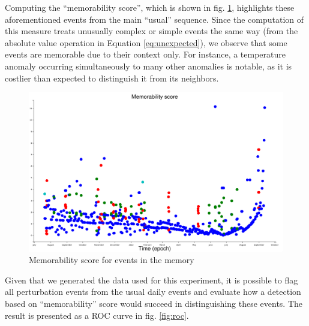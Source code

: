 \documentclass[conference]{IEEEtran}
\begin{document}
Computing the ``memorability score'', which is shown in fig. \ref{fig:result1},
highlights these aforementioned events from the main ``usual'' sequence. Since
the computation of this measure treats unusually complex or simple events the
same way (from the absolute value operation in Equation \ref{eq:unexpected}), we
observe that some events are memorable due to their context only. For instance,
a temperature anomaly occurring simultaneously to many other anomalies is
notable, as it is costlier than expected to distinguish it from its neighbors.

\begin{figure}[ht]
  \centering
  \includegraphics[width=\linewidth]{figures/complexities_surprises}
  \caption{Memorability score for events in the memory}
  \label{fig:result1}
\end{figure}

Given that we generated the data used for this experiment, it is possible to
flag all perturbation events from the usual daily events and evaluate how a
detection based on ``memorability'' score would succeed in distinguishing these
events. The result is presented as a ROC curve in fig. \ref{fig:roc}.
\end{document}
